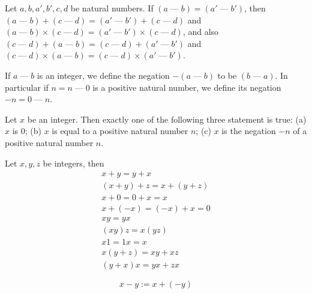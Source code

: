 \documentclass{blog}
\begin{document}
\begin{lemma}
  Let $a, b, a', b', c, d$ be natural numbers. If $(a \mathbin{\text{---}} b) = (a' \mathbin{\text{---}} b')$, then
  $(a \mathbin{\text{---}} b) + (c \mathbin{\text{---}} d) = (a' \mathbin{\text{---}} b') + (c \mathbin{\text{---}} d)$
  and
  $(a \mathbin{\text{---}} b) \times (c \mathbin{\text{---}} d) = (a' \mathbin{\text{---}} b') \times (c \mathbin{\text{---}} d)$,
  and also
  $(c \mathbin{\text{---}} d) + (a \mathbin{\text{---}} b) = (c \mathbin{\text{---}} d) + (a' \mathbin{\text{---}} b')$
  and
  $(c \mathbin{\text{---}} d) \times (a \mathbin{\text{---}} b) = (c \mathbin{\text{---}} d) \times (a' \mathbin{\text{---}} b')$.
\end{lemma}

\begin{definition}[negation]
  If $a \mathbin{\text{---}} b$ is an integer, we define the negation $-(a \mathbin{\text{---}} b)$ to be
  $(b \mathbin{\text{---}} a)$.
  In particular if $n = n \mathbin{\text{---}} 0$ is a positive natural number,
  we define its negation $-n = 0 \mathbin{\text{---}} n$.
\end{definition}

\begin{lemma}
  Let $x$ be an integer. Then exactly one of the following three statement is true:
  (a) $x$ is 0;
  (b) $x$ is equal to a positive natural number $n$;
  (c) $x$ is the negation $-n$ of a positive natural number $n$.
\end{lemma}

\begin{proposition}
  Let $x, y, z$ be integers, then
  \begin{gather}
    x + y = y + x \\
    (x + y) + z = x + (y + z) \\
    x + 0 = 0 + x = x \\
    x + (-x) = (-x) + x = 0 \\
    x y = y x \\
    (x y) z = x (y z) \\
    x 1 = 1 x = x \\
    x (y + z) = x y + x z \\
    (y + x) x = y x + z x
  \end{gather}
\end{proposition}

\begin{definition}[substraction]
  \begin{equation}
    x - y := x + (-y)
  \end{equation}
\end{definition}
\end{document}
